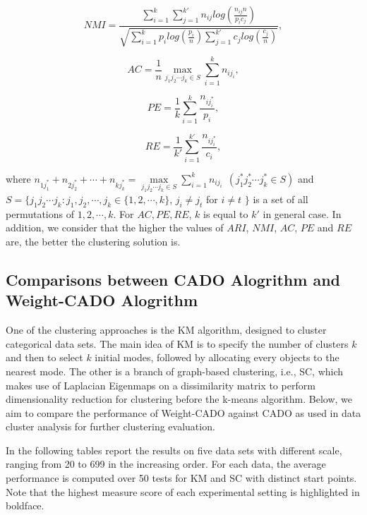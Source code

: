 \documentclass[review]{elsarticle}
\begin{document}
$$NMI=\frac{\sum_{i=1}^k\sum_{j=1}^{k'}n_{ij}log(\frac{n_{ij}n}{p_{i}c_{j}})}
         {\sqrt{\sum_{i=1}^{k}p_{i}log(\frac{p_i}{n})\sum_{j=1}^{k'}c_{j}log(\frac{c_j}{n})}},$$

$$AC=\frac{1}{n}\max\limits_{j_1 j_2 \cdots j_k \in S}\sum_{i=1}^{k}n_{ij_i},$$

$$PE=\frac{1}{k}\sum_{i=1}^{k}\frac{n_{ij_i^*}}{p_i},$$

$$RE=\frac{1}{k'}\sum_{i=1}^{k'}\frac{n_{ij_i^*}}{c_{i}},$$

where  $n_{1j_1^*}+n_{2j_2^*}+\cdots+n_{kj_k^*}=\max\limits_{j_1 j_2 \cdots j_k \in S}\sum_{i=1}^{k}n_{ij_i}\ \ (j_1^* j_2^* \cdots j_k^* \in S)$ and $S=\{j_1j_2 \cdots j_k: j_1,j_2, \cdots, j_k \in \{1,2,\cdots,k\}$, $j_i\neq j_t$ for $i\neq t$ $\}$ is a set of all permutations of $1,2,\cdots,k$. For $AC, PE, RE$, $k$ is equal to $k'$ in general case. In addition, we consider that the higher the values of $ARI$, $NMI$, $AC$, $PE$ and $RE$ are, the better the clustering solution is.

\subsection{Comparisons between CADO Alogrithm and Weight-CADO Alogrithm}
One of the clustering approaches is the KM algorithm, designed to cluster categorical data sets. The main idea of KM is to specify the number of clusters $k$ and then to select $k$ initial modes, followed by allocating every objects to the nearest mode. The other is a branch of graph-based clustering, i.e., SC, which makes use of Laplacian Eigenmaps on a dissimilarity matrix to perform dimensionality reduction for clustering before the k-means algorithm. Below, we aim to compare the performance of Weight-CADO against CADO as used in data cluster analysis for further clustering evaluation.

In the following tables report the results on five data sets with different scale, ranging from 20 to 699 in the increasing order. For each data, the average performance is computed over 50 tests for KM and SC with distinct start points. Note that the highest measure score of each experimental setting is highlighted in boldface.
\end{document}
